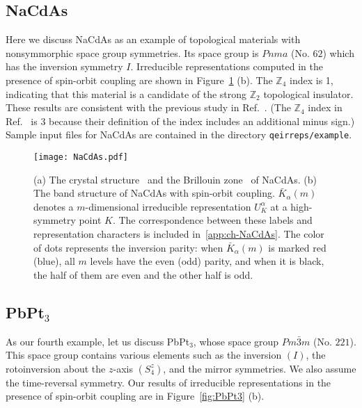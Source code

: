 \documentclass[3p,preprint]{elsarticle}
\newcommand{\mZ}{\mathbb{Z}}
\begin{document}
\subsection{NaCdAs}
\label{sub-sec:ex-NaCdAs}
Here we discuss NaCdAs as an example of topological materials with nonsymmorphic space group symmetries. Its space group is $Pnma$ (No. $62$) which has the inversion symmetry $I$. Irreducible representations computed in the presence of spin-orbit coupling are shown in Figure~\ref{fig:NaCdAs} (b). The $\mZ_4$ index is 1, indicating that this material is a candidate of the strong $\mathbb{Z}_2$ topological insulator. These results are consistent with the previous study in Ref.~\cite{Vergniory2019}. (The $\mZ_4$ index in Ref.~\cite{Vergniory2019} is 3 because their definition of the index includes an additional minus sign.) Sample input files for NaCdAs are contained in the directory \texttt{qeirreps/example}.

\begin{figure}[H]
	\begin{center}
		\texttt{[image: NaCdAs.pdf]}
		\caption{\label{fig:NaCdAs}
(a) The crystal structure~\cite{mp} and the Brillouin zone~\cite{seekpath1,seekpath2} of NaCdAs. (b) The band structure of NaCdAs with spin-orbit coupling. $\bar{K}_{\alpha}(m)$ denotes a $m$-dimensional irreducible representation $U_{K}^{\alpha}$ at a high-symmetry point $K$. The correspondence between these labels and representation characters is included in~\ref{app:ch-NaCdAs}. The color of dots represents the inversion parity: when $\bar{K}_{\alpha}(m)$ is marked red (blue), all $m$ levels have the even (odd) parity, and when it is black, the half of them are even and the other half is odd.}
	\end{center}
\end{figure}


\subsection{PbPt$_3$}
\label{sub-sec:ex-PbPt3}
As our fourth example, let us discuss PbPt$_3$, whose space group ${Pm\bar{3}m}$ (No. $221$).  This space group contains various elements such as the inversion $(I)$, the rotoinversion about the $z$-axis $(S_{4}^z)$, and the mirror symmetries. We also assume the time-reversal symmetry. Our results of irreducible representations in the presence of spin-orbit coupling are in Figure~\ref{fig:PbPt3} (b).
\end{document}
